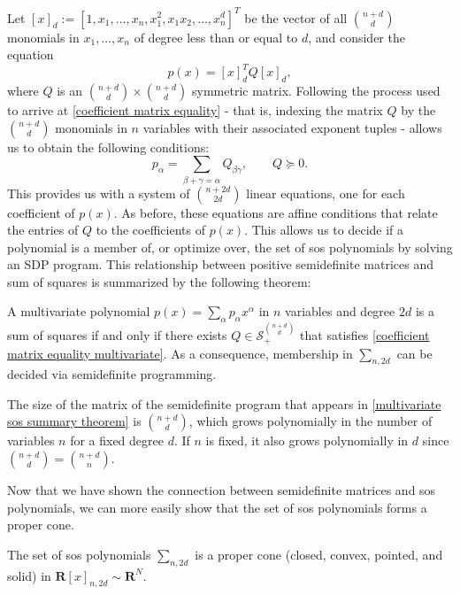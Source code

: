 	Let $[x]_d := [1, x_1, \dots, x_n, x_1^2, x_1 x_2, \dots, x_n^d]^T$ be the vector of all $\binom{n+d}{d}$ monomials in $x_1, \dots, x_n$ of degree less than or equal to $d$, and consider the equation 
	\begin{equation} \label{multivariate poly sos}
		p(x) = [x]_d^T Q [x]_d,
	\end{equation}
	where $Q$ is an $\binom{n+d}{d} \times \binom{n+d}{d}$ symmetric matrix. Following the process used to arrive at \eqref{coefficient matrix equality} - that is, indexing the matrix $Q$ by the $\binom{n+d}{d}$ monomials in $n$ variables with their associated exponent tuples - allows us to obtain the following conditions:
	\begin{equation} \label{coefficient matrix equality multivariate}
		p_{\alpha} = \sum_{\beta + \gamma = \alpha} Q_{\beta \gamma}, \qquad Q \succeq 0.
	\end{equation}
	This provides us with a system of $\binom{n+2d}{2d}$ linear equations, one for each coefficient of $p(x)$. As before, these equations are affine conditions that relate the entries of $Q$ to the coefficients of $p(x)$. This allows us to decide if a polynomial is a member of, or optimize over, the set of sos polynomials by solving an SDP program. This relationship between positive semidefinite matrices and sum of squares is summarized by the following theorem:
	\begin{theorem} \label{multivariate sos summary theorem}
		A multivariate polynomial $p(x) = \sum_{\alpha} p_{\alpha} x^{\alpha}$ in $n$ variables and degree $2d$  is a sum of squares if and only if there exists $Q \in \mathcal{S}_{+}^{\binom{n+d}{d}}$ that satisfies \eqref{coefficient matrix equality multivariate}. As a consequence, membership in $\sum_{n, 2d}$ can be decided via semidefinite programming. 
	\end{theorem}
	
	The size of the matrix of the semidefinite program that appears in \eqref{multivariate sos summary theorem} is $\binom{n+d}{d}$, which grows polynomially in the number of variables $n$ for a fixed degree $d$. If $n$ is fixed, it also grows polynomially in $d$ since $\binom{n+d}{d} = \binom{n+d}{n}$. 
	
	Now that we have shown the connection between semidefinite matrices and sos polynomials, we can more easily show that the set of sos polynomials forms a proper cone.
	
	\begin{theorem}
		The set of sos polynomials $\sum_{n, 2d}$ is a proper cone (closed, convex, pointed, and solid) in $\mathbf{R}[x]_{n, 2d} \sim \mathbf{R}^N$.
	\end{theorem}
	
